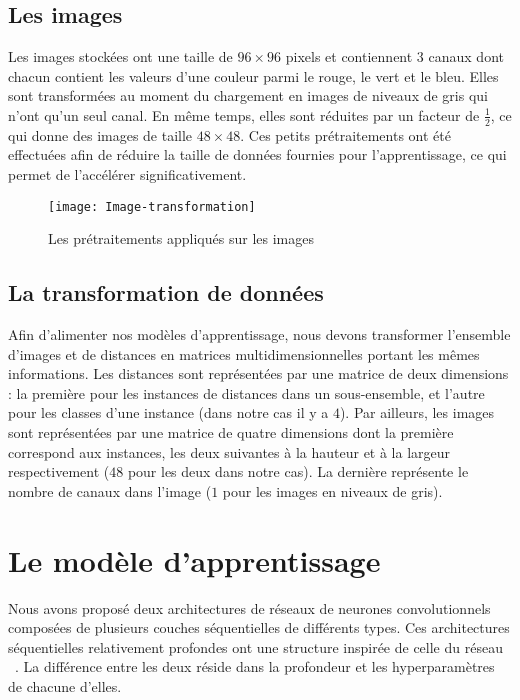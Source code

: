 \subsection{Les images}

Les images stockées ont une taille de $96 \times 96$ pixels et contiennent $3$
canaux dont chacun contient les valeurs d'une couleur parmi le rouge, le vert et
le bleu. Elles sont transformées au moment du chargement en images de niveaux
de gris qui n’ont qu’un seul canal. En même temps, elles sont réduites par un
facteur de $\frac{1}{2}$, ce qui donne des images de taille $48 \times 48$.
Ces petits prétraitements ont été effectuées afin de réduire la taille de données
fournies pour l'apprentissage, ce qui permet de l'accélérer significativement.

\begin{figure}[h]
\begin{center}
\texttt{[image: Image-transformation]}
\caption{Les prétraitements appliqués sur les images}
\end{center}
\end{figure}

\subsection{La transformation de données}

Afin d'alimenter nos modèles d'apprentissage, nous devons transformer l'ensemble
d'images et de distances en matrices multidimensionnelles portant les mêmes
informations. Les distances sont représentées par une matrice de deux dimensions :
la première pour les instances de distances dans un sous-ensemble, et l'autre pour
les classes d'une instance (dans notre cas il y a $4$). Par ailleurs, les images
sont représentées par une matrice de quatre dimensions dont la première correspond
aux instances, les deux suivantes à la hauteur et à la largeur
respectivement ($48$ pour les deux dans notre cas). La dernière représente le
nombre de canaux dans l'image ($1$ pour les images en niveaux de gris).

\section{Le modèle d'apprentissage}

Nous avons proposé deux architectures de réseaux de neurones convolutionnels composées
de plusieurs couches séquentielles de différents types. Ces architectures
séquentielles relativement profondes ont une structure inspirée de celle du
réseau ~\cite{simonyan2014very}. La différence entre les deux
réside dans la profondeur et les hyperparamètres de chacune d'elles.

